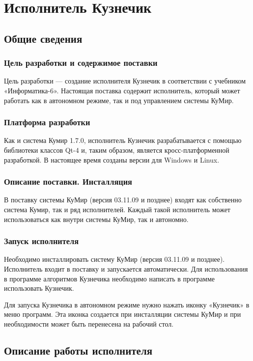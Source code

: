 \chapter*{Исполнитель Кузнечик}
\addtocounter{chapter}{1}

\section{Общие сведения}

\subsection{Цель разработки и содержимое поставки}
Цель разработки --- создание исполнителя Кузнечик в соответствии с учебником «Инфор\-ма\-тика-6». Настоящая поставка содержит исполнитель, который может работать как в автономном режиме, так и под управлением системы КуМир.

\subsection{Платформа разработки}
Как и система Кумир 1.7.0, исполнитель Кузнечик  разрабатывается с помощью библиотеки классов Qt-4 и, таким образом, является кросс-платформенной разработкой. В настоящее время созданы версии для Windows и Linux. 

\subsection{Описание поставки. Инсталляция}
В поставку системы КуМир (версия 03.11.09 и позднее) входят как собственно система Кумир, так и ряд исполнителей. Каждый такой исполнитель может использоваться как внутри системы КуМир, так и автономно.

\subsection{Запуск исполнителя}
Необходимо инсталлировать систему КуМир (версия 03.11.09 и позднее). Исполнитель входит в поставку и запускается автоматически. Для использования в программе алгоритмов Кузнечика необходимо написать в программе \textsf{использовать Кузнечик}.

Для запуска Кузнечика в автономном режиме нужно нажать иконку «Кузнечик» в меню программ. Эта иконка создается при инсталляции системы КуМир и при необходимости может быть перенесена на рабочий стол.

\section{Описание работы исполнителя}


